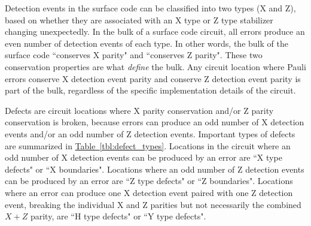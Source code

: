 \documentclass[onecolumn,unpublished,a4paper]{quantumarticle}
\theoremstyle{definition}
\theoremstyle{definition}
\theoremstyle{definition}
\newcommand{\tbl}[1]{\hyperref[tbl:#1]{Table~\ref*{tbl:#1}}}
\begin{document}
\begin{table}[H]
    \centering
    \caption{
        Summary of types of defects in surface code circuits.
    }
    \label{tbl:defect_types}
\end{table}

Detection events in the surface code can be classified into two types (X and Z), based on whether they are associated with an X type or Z type stabilizer changing unexpectedly.
In the bulk of a surface code circuit, all errors produce an even number of detection events of each type.
In other words, the bulk of the surface code ``conserves X parity" and ``conserves Z parity".
These two conservation properties are what \emph{define} the bulk.
Any circuit location where Pauli errors conserve X detection event parity and conserve Z detection event parity is part of the bulk, regardless of the specific implementation details of the circuit.

Defects are circuit locations where X parity conservation and/or Z parity conservation is broken, because errors can produce an odd number of X detection events and/or an odd number of Z detection events.
Important types of defects are summarized in \tbl{defect_types}.
Locations in the circuit where an odd number of X detection events can be produced by an error are ``X type defects" or ``X boundaries".
Locations where an odd number of Z detection events can be produced by an error are ``Z type defects" or ``Z boundaries".
Locations where an error can produce one X detection event paired with one Z detection event, breaking the individual X and Z parities but not necessarily the combined $X+Z$ parity, are ``H type defects" or ``Y type defects".
\end{document}
